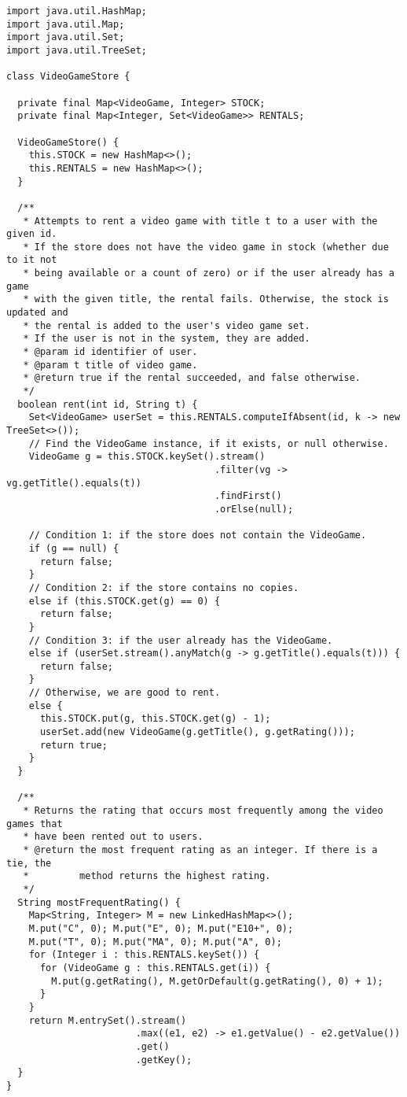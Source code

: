 \enlargethispage{-4\baselineskip}
\begin{lstlisting}[language=MyJava]
import java.util.HashMap;
import java.util.Map;
import java.util.Set;
import java.util.TreeSet;

class VideoGameStore {

  private final Map<VideoGame, Integer> STOCK;
  private final Map<Integer, Set<VideoGame>> RENTALS;

  VideoGameStore() {
    this.STOCK = new HashMap<>();  
    this.RENTALS = new HashMap<>();
  }

  /**
   * Attempts to rent a video game with title t to a user with the given id.
   * If the store does not have the video game in stock (whether due to it not
   * being available or a count of zero) or if the user already has a game
   * with the given title, the rental fails. Otherwise, the stock is updated and
   * the rental is added to the user's video game set.
   * If the user is not in the system, they are added.
   * @param id identifier of user.
   * @param t title of video game.
   * @return true if the rental succeeded, and false otherwise.
   */
  boolean rent(int id, String t) {
    Set<VideoGame> userSet = this.RENTALS.computeIfAbsent(id, k -> new TreeSet<>());
    // Find the VideoGame instance, if it exists, or null otherwise.
    VideoGame g = this.STOCK.keySet().stream()
                                     .filter(vg -> vg.getTitle().equals(t))
                                     .findFirst()
                                     .orElse(null);

    // Condition 1: if the store does not contain the VideoGame.
    if (g == null) {
      return false;
    } 
    // Condition 2: if the store contains no copies.
    else if (this.STOCK.get(g) == 0) {
      return false;
    } 
    // Condition 3: if the user already has the VideoGame.
    else if (userSet.stream().anyMatch(g -> g.getTitle().equals(t))) {
      return false;
    }
    // Otherwise, we are good to rent.
    else {
      this.STOCK.put(g, this.STOCK.get(g) - 1);
      userSet.add(new VideoGame(g.getTitle(), g.getRating()));
      return true;
    }
  }

  /**
   * Returns the rating that occurs most frequently among the video games that
   * have been rented out to users.
   * @return the most frequent rating as an integer. If there is a tie, the
   *         method returns the highest rating.
   */
  String mostFrequentRating() {
    Map<String, Integer> M = new LinkedHashMap<>();
    M.put("C", 0); M.put("E", 0); M.put("E10+", 0); 
    M.put("T", 0); M.put("MA", 0); M.put("A", 0);
    for (Integer i : this.RENTALS.keySet()) {
      for (VideoGame g : this.RENTALS.get(i)) {
        M.put(g.getRating(), M.getOrDefault(g.getRating(), 0) + 1);
      }
    }
    return M.entrySet().stream()
                       .max((e1, e2) -> e1.getValue() - e2.getValue())
                       .get()
                       .getKey();
  }
}
\end{lstlisting}

